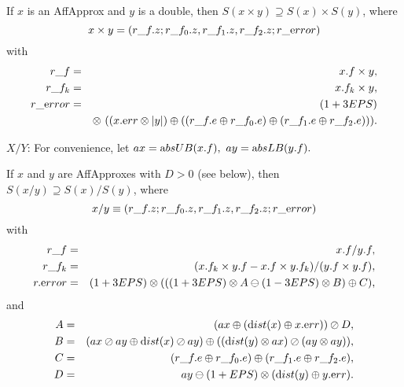 \begin{proposition}\label{GMT 8.7} \hskip-8pt If $x$ is an 
AffApprox  and $y$ is a double{\textrm ,} 
then $S(x \times y) \supseteq S(x) \times S(y)${\textrm ,} where
$$x \times y = (r\_f.z; r\_f_0.z, r\_f_1.z, r\_f_2.z; r\_{\textrm error})$$
with
\begin{eqnarray*}
r\_f& =& x.f \times y,\\
r\_f_k &=& x.f_k \times y,\\
r\_{\textrm error} &=& (1+3EPS)\\
&& \otimes\ ( (x.{\textrm err} \otimes |y|) \oplus
( (r\_f.e \oplus r\_f_0.e) \oplus (r\_f_1.e \oplus r\_f_2.e)) ).
\end{eqnarray*}
\end{proposition}

$X/Y$: 
For convenience, let  $ax = {\textrm absUB}(x.f),\ ay = {\textrm absLB}(y.f).$ 
 
\begin{proposition}\label{GMT 8.8} If $x$ and $y$ are 
{\textrm AffApproxes}  with $D > 0$ {\textrm (}\/see below{\textrm ),} then
$S(x / y) \supseteq S(x) / S(y)${\textrm ,} where
$$x / y \equiv (r\_f.z; r\_f_0.z, r\_f_1.z, r\_f_2.z; r\_{\textrm error})$$
with
\begin{eqnarray*}
r\_f &=& x.f / y.f,
\\
r\_f_k& =& (x.f_k \times y.f - x.f \times y.f_k)/ (y.f \times y.f),\\
r.{\textrm error} & =& (1 + 3EPS) \otimes (
((1 + 3EPS) \otimes A \ominus (1 - 3EPS) \otimes B )\oplus C ),\end{eqnarray*}
and
\begin{eqnarray*}
A &=& (ax \oplus ({\textrm dist}(x) \oplus x.{\textrm err})) \oslash D,\\
B &=& (ax \oslash ay \oplus {\textrm dist}(x) \oslash ay)
\oplus  (({\textrm dist}(y) \otimes ax) \oslash (ay \otimes ay)),\\
C &=& (r\_f.e \oplus r\_f_0.e) \oplus (r\_f_1.e \oplus
r\_f_2.e),\\
D &=& ay \ominus (1 + EPS) \otimes ({\textrm dist}(y) \oplus y.{\textrm err}).
\end{eqnarray*}
\end{proposition}

